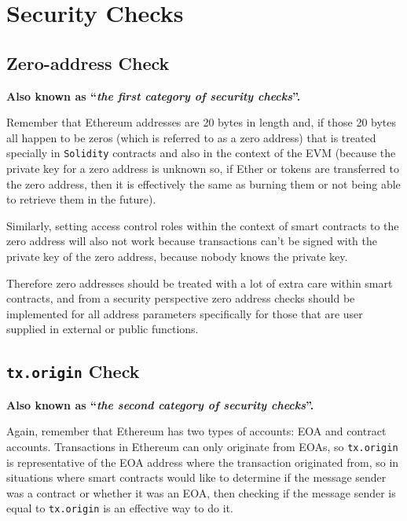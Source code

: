\section{Security Checks}\label{security-checks}

\subsection{Zero-address Check}\label{zero-address-check}

\textbf{Also known as ``\emph{the first category of security checks}''.}

Remember that Ethereum addresses are 20 bytes in length and, if those 20
bytes all happen to be zeros (which is referred to as a zero address)
that is treated specially in \texttt{Solidity} contracts and also in the
context of the EVM (because the private key for a zero address is
unknown so, if Ether or tokens are transferred to the zero address, then
it is effectively the same as burning them or not being able to retrieve
them in the future).

Similarly, setting access control roles within the context of smart
contracts to the zero address will also not work because transactions
can't be signed with the private key of the zero address, because nobody
knows the private key.

Therefore zero addresses should be treated with a lot of extra care
within smart contracts, and from a security perspective zero address
checks should be implemented for all address parameters specifically for
those that are user supplied in external or public functions.

\subsection{\texorpdfstring{\texttt{tx.origin}
Check}{tx.origin Check}}\label{tx.origin-check}

\textbf{Also known as ``\emph{the second category of security
checks}''.}

Again, remember that Ethereum has two types of accounts: EOA and
contract accounts. Transactions in Ethereum can only originate from
EOAs, so \texttt{tx.origin} is representative of the EOA address where
the transaction originated from, so in situations where smart contracts
would like to determine if the message sender was a contract or whether
it was an EOA, then checking if the message sender is equal to
\texttt{tx.origin} is an effective way to do it.

